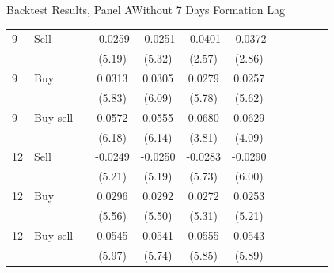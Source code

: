 \documentclass{beamer}
\begin{document}
\begin{frame}{Backtest Results, Panel A}{Without 7 Days Formation Lag}
\begin{table}
\begin{tabular}{llrSSSScSSSS}
            9  & Sell     &    & -0.0259               & -0.0251               & -0.0401               & -0.0372                \\
               &          &    & (5.19)                & (5.32)                & (2.57)                & (2.86)                 \\
            9  & Buy      &    & 0.0313                & 0.0305                & 0.0279                & 0.0257                 \\
               &          &    & (5.83)                & (6.09)                & (5.78)                & (5.62)                 \\
            9  & Buy-sell &    & 0.0572                & 0.0555                & 0.0680                & 0.0629                 \\
               &          &    & (6.18)                & (6.14)                & (3.81)                & (4.09)                 \\
            12 & Sell     &    & -0.0249               & -0.0250               & -0.0283               & -0.0290                \\
               &          &    & (5.21)                & (5.19)                & (5.73)                & (6.00)                 \\
            12 & Buy      &    & 0.0296                & 0.0292                & 0.0272                & 0.0253                 \\
               &          &    & (5.56)                & (5.50)                & (5.31)                & (5.21)                 \\
            12 & Buy-sell &    & 0.0545                & 0.0541                & 0.0555                & 0.0543                 \\
               &          &    & (5.97)                & (5.74)                & (5.85)                & (5.89)                 \\
            \bottomrule
        \end{tabular}
    \end{table}
\end{frame}
\end{document}
